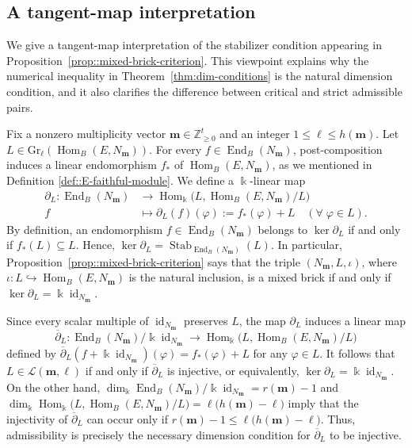\documentclass[a4,12pt]{amsart}
\numberwithin{equation}{section} %
\def\Hom{\operatorname{Hom}} %
\def\End{\operatorname{End}} %
\def\Stab{\operatorname{Stab}} %
\def\Gr{\mathrm{Gr}} %
\theoremstyle{definition} %
\begin{document}
\subsection{A tangent-map interpretation}
We give a tangent-map interpretation of the stabilizer condition appearing in Proposition~\ref{prop::mixed-brick-criterion}. This viewpoint explains why the numerical inequality in Theorem~\ref{thm:dim-conditions} is the natural dimension condition, and it also clarifies the difference between critical and strict admissible pairs.

Fix a nonzero multiplicity vector $\mathbf{m}\in\mathbb{Z}_{\geq 0}^t$ and an integer $1\leq \ell\leq h(\mathbf{m})$. Let $L\in\Gr_\ell(\Hom_B(E,N_{\mathbf{m}}))$. For every $f\in\End_B(N_{\mathbf{m}})$, post-composition induces a linear endomorphism $f_*$ of $\Hom_B(E,N_{\mathbf{m}})$, as we mentioned in Definition \ref{def::E-faithful-module}. We define a $\Bbbk$-linear map
\[
\begin{aligned}
\partial_L\colon
\End_B(N_{\mathbf{m}})
&\longrightarrow
\Hom_{\Bbbk}\bigl(L,\Hom_B(E,N_{\mathbf{m}})/L\bigr)\\
f & \longmapsto\partial_L(f)(\varphi):=f_*(\varphi)+L \quad (\forall \; \varphi\in L).
\end{aligned}
\]
By definition, an endomorphism $f\in\End_B(N_{\mathbf{m}})$ belongs to $\ker\partial_L$ if and only if $f_*(L)\subseteq L$. Hence, $\ker\partial_L = \Stab_{\End_B(N_{\mathbf{m}})}(L)$. In particular, Proposition~\ref{prop::mixed-brick-criterion} says that the triple $(N_{\mathbf{m}},L,\iota)$, where $\iota\colon L\hookrightarrow\Hom_B(E,N_{\mathbf{m}})$ is the natural inclusion, is a mixed brick if and only if $\ker\partial_L=\Bbbk\operatorname{id}_{N_{\mathbf{m}}}$. 

Since every scalar multiple of $\operatorname{id}_{N_{\mathbf{m}}}$ preserves $L$, the map $\partial_L$ induces a linear map
\[
\overline{\partial}_L\colon
\End_B(N_{\mathbf{m}})/\Bbbk\operatorname{id}_{N_{\mathbf{m}}}
\longrightarrow
\Hom_{\Bbbk}\bigl(L,\Hom_B(E,N_{\mathbf{m}})/L\bigr)
\]
defined by $\overline{\partial}_L \left( f+\Bbbk\operatorname{id}_{N_{\mathbf{m}}} \right) (\varphi) = f_*(\varphi)+L$ for any $\varphi\in L$. It follows that $L\in\mathcal{L}(\mathbf{m},\ell)$ if and only if $\overline{\partial}_L$ is injective, or equivalently, $\ker\partial_L=\Bbbk\operatorname{id}_{N_{\mathbf{m}}}$. On the other hand, $\dim_{\Bbbk}\End_B(N_{\mathbf{m}})/\Bbbk\operatorname{id}_{N_{\mathbf{m}}}
= r(\mathbf{m})-1$ and $\dim_{\Bbbk}\Hom_{\Bbbk}\bigl(L,\Hom_B(E,N_{\mathbf{m}})/L\bigr)
=
\ell\bigl(h(\mathbf{m})-\ell\bigr)$ imply that the injectivity of $\overline{\partial}_L$ can occur only if $r(\mathbf{m})-1\leq \ell\bigl(h(\mathbf{m})-\ell\bigr)$. Thus, admissibility is precisely the necessary dimension condition for
$\overline{\partial}_L$ to be injective.
\end{document}
